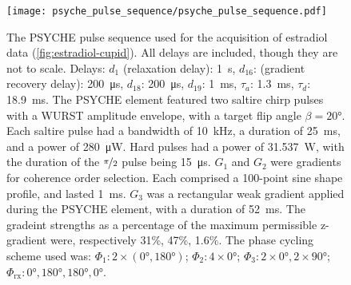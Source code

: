 \begin{figure}[H]
    \texttt{[image: psyche\_pulse\_sequence/psyche\_pulse\_sequence.pdf]}
    \caption[
        The \acs{PSYCHE} pulse sequence used for the acquisition of the estradiol
        data presented in \cref{fig:estradiol-cupid}.
    ]{
        The \acs{PSYCHE} pulse sequence used for the acquisition of estradiol
        data (\cref{fig:estradiol-cupid}). All
        delays are included, though they are not to scale.
        Delays:
        $d_1$ (relaxation delay): \qty{1}{\second},
        $d_{16}$: (gradient recovery delay): \qty{200}{\micro\second},
        $d_{18}$: \qty{200}{\micro\second},
        $d_{19}$: \qty{1}{\milli\second},
        $\tau_a$: \qty{1.3}{\milli\second},
        $\tau_d$: \qty{18.9}{\milli\second}.
        The \ac{PSYCHE} element featured two saltire chirp pulses with a
        \ac{WURST}\cite{ODell2013}
        amplitude envelope, with a target flip angle $\beta = \ang{20}$.
        Each saltire pulse
        had a bandwidth of \qty{10}{\kilo\hertz},
        a duration of \qty{25}{\milli\second},
        and a power of \qty{280}{\micro\watt}.
        Hard pulses
        had a power of \qty{31.537}{\watt},
        with the duration of the $\nicefrac{\pi}{2}$ pulse being \qty{15}{\micro\second}.
        $G_1$ and $G_2$ were gradients for coherence order selection.
        Each comprised a 100-point sine shape profile, and lasted
        \qty{1}{\milli\second}.
        $G_3$ was a rectangular weak gradient applied during the PSYCHE
        element, with a duration of \qty{52}{\milli\second}.
        The gradeint strengths as a percentage of the maximum permissible
        z-gradient were, respectively 31\%, 47\%, 1.6\%.
        The phase cycling scheme used was:
        $\Phi_1: 2 \times (\ang{0}, \ang{180})$;
        $\Phi_2: 4 \times \ang{0}$;
        $\Phi_3: 2 \times \ang{0}, 2 \times \ang{90}$;
        $\Phi_{\text{rx}}: \ang{0}, \ang{180}, \ang{180}, \ang{0}$.
    }
    \label{fig:psyche}

\end{figure}
\clearpage

